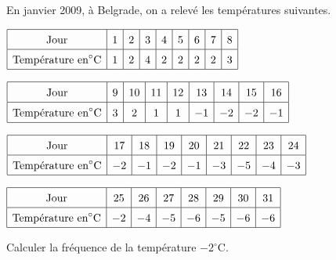 \begin{exercice*}[Températures]
    En janvier 2009, à Belgrade, on a relevé les températures suivantes.

    \smallskip
    $\def\arraystretch{1.5}
    \begin{array}{|c|c|c|c|c|c|c|c|c|}
        \hline  
        \text{Jour}                             &1&2&3&4&5&6&7&8\\\hline
        \text{Température en}  ^\circ\text{C}   &1&2&4&2&2&2&2&3\\\hline
    \end{array}$
    
    $\def\arraystretch{1.5}
    \begin{array}{|c|c|c|c|c|c|c|c|c|}
        \hline
        \text{Jour}                             &9&10&11&12&13&14&15&16\\\hline 
        \text{Température en}  ^\circ\text{C}   &3&2 &1 &1 &-1&-2&-2&-1\\\hline
    \end{array}$

    $\def\arraystretch{1.5}
    \begin{array}{|c|c|c|c|c|c|c|c|c|}
        \hline
        \text{Jour}                             &17&18&19&20&21&22&23&24\\\hline
        \text{Température en}  ^\circ\text{C}   &-2&-1&-2&-1&-3&-5&-4&-3\\\hline
    \end{array}$

    $\def\arraystretch{1.5}
    \begin{array}{|c|c|c|c|c|c|c|c|}
        \hline
        \text{Jour}                             &25&26&27&28&29&30&31\\\hline
        \text{Température en}  ^\circ\text{C}   &-2&-4&-5&-6&-5&-6&-6\\\hline
    \end{array}$

    \medskip
    Calculer la fréquence de la température $-2^\circ\text{C}$.

\end{exercice*}
